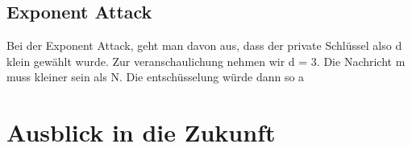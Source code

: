 \subsection{Exponent Attack}
Bei der Exponent Attack, geht man davon aus, dass der private Schlüssel also d klein gewählt wurde. Zur veranschaulichung nehmen wir d = 3.
Die Nachricht m muss kleiner sein als N. Die entschüsselung würde dann so a
\section{Ausblick in die Zukunft}
